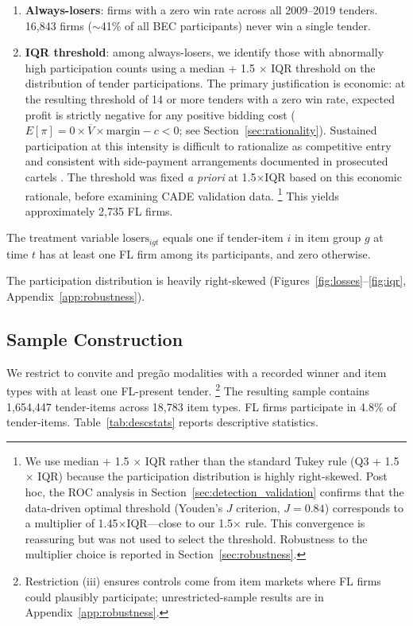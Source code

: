 \begin{enumerate}
  \item \textbf{Always-losers}: firms with a zero win rate across all
    2009--2019 tenders. 16,843 firms ($\sim$41\% of all
    BEC participants) never win a single tender.
  \item \textbf{IQR threshold}: among always-losers, we identify those
    with abnormally high participation counts using a median + 1.5
    $\times$ IQR threshold on the distribution of tender
    participations. The primary justification is economic: at the
    resulting threshold of 14 or more tenders with a zero win rate,
    expected profit is strictly negative for any positive bidding cost
    ($E[\pi] = 0 \times \overline{V} \times \text{margin} - c < 0$;
    see Section~\ref{sec:rationality}). Sustained participation at this
    intensity is difficult to rationalize as competitive entry and
    consistent with side-payment arrangements documented in prosecuted
    cartels \citep{asker2010leniency, marshall2012economics}. The
    threshold was fixed \emph{a priori} at 1.5$\times$IQR based on
    this economic rationale, before examining CADE validation data.%
    \footnote{We use median + 1.5 $\times$ IQR rather than the standard
    Tukey rule (Q3 + 1.5 $\times$ IQR) because the participation
    distribution is highly right-skewed. Post hoc, the ROC analysis in
    Section~\ref{sec:detection_validation} confirms that the
    data-driven optimal threshold (Youden's $J$ criterion,
    $J = 0.84$) corresponds to a multiplier of
    1.45$\times$IQR---close to our 1.5$\times$ rule. This convergence
    is reassuring but was not used to select the threshold.
    Robustness to the multiplier choice is reported in
    Section~\ref{sec:robustness}.}
    This yields approximately 2,735 FL firms.
\end{enumerate}

The treatment variable $\text{losers}_{igt}$ equals one if tender-item
$i$ in item group $g$ at time $t$ has at least one FL firm among its
participants, and zero otherwise.

The participation distribution is heavily right-skewed (Figures~\ref{fig:losses}--\ref{fig:iqr}, Appendix~\ref{app:robustness}).

\subsection{Sample Construction}
\label{sec:sample}

We restrict to convite and preg\~ao modalities with a recorded winner and item types with at least one FL-present tender.%
\footnote{Restriction (iii) ensures controls come from item markets where FL firms could plausibly participate; unrestricted-sample results are in Appendix~\ref{app:robustness}.}
The resulting sample contains 1,654,447 tender-items across 18,783 item types. FL firms participate in 4.8\% of tender-items. Table~\ref{tab:descstats} reports descriptive statistics.

